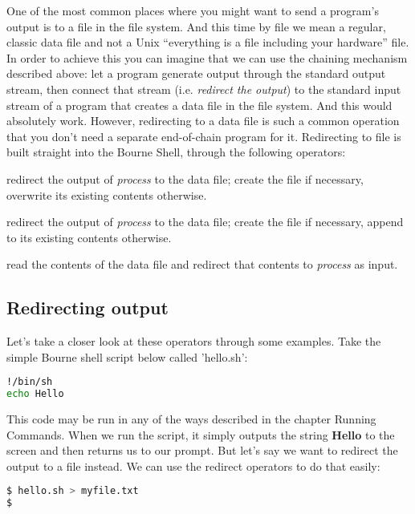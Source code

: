 One of the most common places where you might want to send a program's output
is to a file in the file system. And this time by file we mean a regular,
classic data file and not a Unix ``everything is a file including your
hardware'' file. In order to achieve this you can imagine that we can use the
chaining mechanism described above: let a program generate output through the
standard output stream, then connect that stream (i.e. \emph{redirect the
output}) to the standard input stream of a program that creates a data file in
the file system. And this would absolutely work. However, redirecting to a data
file is such a common operation that you don't need a separate end-of-chain
program for it. Redirecting to file is built straight into the Bourne Shell,
through the following operators:
\begin{description}
\setlength{\leftmargin}{0pt}
\setlength{\itemsep}{0pt}
\setlength{\parsep}{0pt}
\setlength{\parskip}{0pt}
	\item[\emph{process} \textgreater{} \emph{data file}] redirect the output
of \emph{process} to the data file; create the file if necessary, overwrite its
existing contents otherwise.
	\item[\emph{process} \textgreater{}\textgreater{} \emph{data file}]
redirect the output of \emph{process} to the data file; create the file if
necessary, append to its existing contents otherwise.
	\item[\emph{process} \textless{} \emph{data file}] read the contents of the
data file and redirect that contents to \emph{process} as input.
\end{description}

\subsection{Redirecting output}
Let's take a closer look at these operators through some examples. Take the
simple Bourne shell script below called 'hello.sh':
\lstset{basicstyle=\scriptsize, numbers=left, captionpos=b, tabsize=4}
\begin{lstlisting}[caption=A simple shell script that generates some output,language={bash},
breaklines=true,xleftmargin=15pt,label=lst:A simple shell script that generates some output]
!/bin/sh
echo Hello
\end{lstlisting}

This code may be run in any of the ways described in the chapter Running
Commands. When we run the script, it simply outputs the string \textbf{Hello}
to the screen and then returns us to our prompt. But let's say we want to
redirect the output to a file instead. We can use the redirect operators to do
that easily:
\lstset{basicstyle=\scriptsize, numbers=left, captionpos=b, tabsize=4}
\begin{lstlisting}[caption=Redirecting the output to a data file,language={bash},
breaklines=true,xleftmargin=15pt,label=lst:Redirecting the output to a data file]
$ hello.sh > myfile.txt
$
\end{lstlisting}

